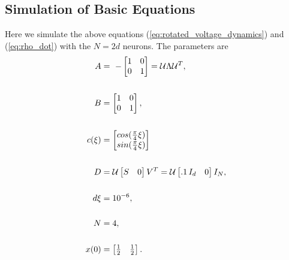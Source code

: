 \clearpage

\subsection{Simulation of Basic Equations}
Here we simulate the above equations (\ref{eq:rotated_voltage_dynamics}) and (\ref{eq:rho_dot}) with the $N = 2d$ neurons. The parameters are
\begin{align}
\label{eq:sim_I_params}
A
&=
\ -\begin{bmatrix}  
1 & 0 \\
0 & 1
\end{bmatrix} = \mathcal{U} \Lambda \mathcal{U}^T \notag,
\\
\notag
\\
B
&=
\begin{bmatrix}  
1 & 0 \\
0 & 1
\end{bmatrix}, \notag 
\\
\notag 
\\
c(\xi) 
&=
\begin{bmatrix} 
cos(\frac{\pi}{4} \xi)\\
sin(\frac{\pi}{4} \xi)
\end{bmatrix} 
\\
\notag
\\
D
&=
\mathcal{U} 
\begin{bmatrix}
S & 0
\end{bmatrix}
V^T
=
\mathcal{U} 
\begin{bmatrix}
.1 \, I_d & 0
\end{bmatrix}
I_N \notag,
\\
\notag 
\\
d\xi 
&= 
10^{-6}, \notag 
\\
\notag 
\\
N 
&= 
4,\notag 
\\
\notag 
\\
x(0) 
&= 
\begin{bmatrix} \frac{1}{2} & \frac{1}{2} \end{bmatrix}.\notag 
\end{align}


